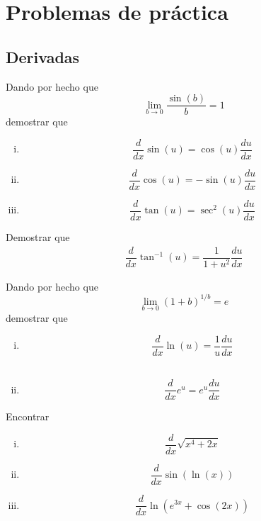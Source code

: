 \section{Problemas de práctica}

\subsection{Derivadas}

\begin{problema}
	Dando por hecho que \[\lim_{b\to 0}\dfrac{\sin(b)}{b}=1\] demostrar que
	\begin{enumerate}[(i)]
		\item \[\dfrac{d}{dx}\sin(u)=\cos(u)\dfrac{du}{dx}\]
		\item \[\dfrac{d}{dx}\cos(u)=-\sin(u)\dfrac{du}{dx}\]
		\item \[\dfrac{d}{dx}\tan(u)=\sec^{2}(u)\dfrac{du}{dx}\]

	\end{enumerate}
\end{problema}



{}
\begin{problema}

	Demostrar que
	\begin{align*}
		\dfrac{d}{dx}\tan^{-1}\left( u \right) =
		\dfrac{1}{1+u^{2}}\dfrac{du}{dx}
	\end{align*}
\end{problema}



{}
\begin{problema}
	Dando por hecho que \[\lim_{b\to 0}\left( 1+b \right)^{1/b}=e\] demostrar que
	\begin{enumerate}[(i)]
		\item \[\dfrac{d}{dx}\ln(u)=\dfrac{1}{u}\dfrac{du}{dx}\] \\

		\item \[\dfrac{d}{dx}e^{u}= e^{u}\dfrac{du}{dx}\]
	\end{enumerate}
\end{problema}



{}
\begin{problema}
	Encontrar
	\begin{enumerate}[(i)]
		\item \[\dfrac{d}{dx}\sqrt{x^{4}+2x}\]

		\item \[\dfrac{d}{dx}\sin\left( \ln(x) \right)\]

		\item \[\dfrac{d}{dx}\ln\left( e^{3x}+ \cos\left( 2x \right) \right)\]
	\end{enumerate}
\end{problema}



